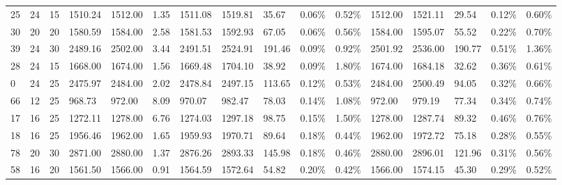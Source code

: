 \documentclass[../main]{subfiles}
\begin{document}
\begin{longtable}{l|ll|lll|lllll|lllll}
   25 & 24                         & 15                         & 1510.24                   & 1512.00     & 1.35                & 1511.08 & 1519.81 & 35.67  & 0.06\%  & 0.52\% & 1512.00 & 1521.11 & 29.54  & 0.12\%  & 0.60\% \\
   30 & 20                         & 20                         & 1580.59                   & 1584.00     & 2.58                & 1581.53 & 1592.93 & 67.05  & 0.06\%  & 0.56\% & 1584.00 & 1595.07 & 55.52  & 0.22\%  & 0.70\% \\
   39 & 24                         & 30                         & 2489.16                   & 2502.00     & 3.44                & 2491.51 & 2524.91 & 191.46 & 0.09\%  & 0.92\% & 2501.92 & 2536.00 & 190.77 & 0.51\%  & 1.36\% \\
   28 & 24                         & 15                         & 1668.00                   & 1674.00     & 1.56                & 1669.48 & 1704.10 & 38.92  & 0.09\%  & 1.80\% & 1674.00 & 1684.18 & 32.62  & 0.36\%  & 0.61\% \\
   0  & 24                         & 25                         & 2475.97                   & 2484.00     & 2.02                & 2478.84 & 2497.15 & 113.65 & 0.12\%  & 0.53\% & 2484.00 & 2500.49 & 94.05  & 0.32\%  & 0.66\% \\
   66 & 12                         & 25                         & 968.73                    & 972.00      & 8.09                & 970.07  & 982.47  & 78.03  & 0.14\%  & 1.08\% & 972.00  & 979.19  & 77.34  & 0.34\%  & 0.74\% \\
   17 & 16                         & 25                         & 1272.11                   & 1278.00     & 6.76                & 1274.03 & 1297.18 & 98.75  & 0.15\%  & 1.50\% & 1278.00 & 1287.74 & 89.32  & 0.46\%  & 0.76\% \\
   18 & 16                         & 25                         & 1956.46                   & 1962.00     & 1.65                & 1959.93 & 1970.71 & 89.64  & 0.18\%  & 0.44\% & 1962.00 & 1972.72 & 75.18  & 0.28\%  & 0.55\% \\
   78 & 20                         & 30                         & 2871.00                   & 2880.00     & 1.37                & 2876.26 & 2893.33 & 145.98 & 0.18\%  & 0.46\% & 2880.00 & 2896.01 & 121.96 & 0.31\%  & 0.56\% \\
   58 & 16                         & 20                         & 1561.50                   & 1566.00     & 0.91                & 1564.59 & 1572.64 & 54.82  & 0.20\%  & 0.42\% & 1566.00 & 1574.15 & 45.30  & 0.29\%  & 0.52\% \\

\end{longtable}
\end{document}
